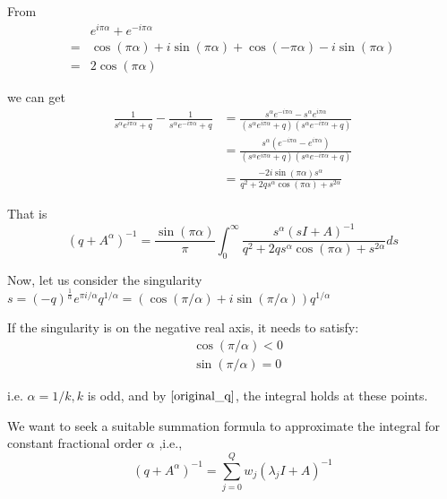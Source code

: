 From
\begin{equation}
	\begin{aligned}
	&e^{i \pi \alpha}+e^{- i \pi \alpha}\\
	=&\cos(\pi \alpha)+i\sin(\pi\alpha)+\cos(-\pi \alpha)-i \sin(\pi \alpha)\\
	=&2\cos(\pi \alpha)
\end{aligned}
\end{equation}

we can get
\begin{equation}
	\begin{aligned}
	\frac{1}{s^{\alpha}e^{i \pi \alpha}+q}-\frac{1}{s^{\alpha}e^{-i \pi \alpha}+q}&=\frac{s^{\alpha}e^{-i \pi \alpha}-s^{\alpha}e^{i \pi \alpha}}{(s^{\alpha}e^{i \pi \alpha}+q)(s^{\alpha}e^{-i \pi \alpha}+q)}\\
	&=\frac{s^{\alpha}(e^{-i \pi \alpha}-e^{i \pi \alpha})}{(s^{\alpha}e^{i \pi \alpha}+q)(s^{\alpha}e^{-i \pi \alpha}+q)}\\
	&=\frac{-2 i \sin(\pi \alpha)s^{\alpha}}{q^2+2qs^{\alpha}\cos(\pi\alpha)+s^{2\alpha}}
\end{aligned}
\end{equation}

That is
\begin{equation}
	(q+{A}^{\alpha})^{-1}=\frac{\sin(\pi \alpha)}{\pi}\int_0^{\infty}\frac{s^{\alpha}(s{I}+{A})^{-1}}{q^2+2qs^{\alpha}\cos(\pi\alpha)+s^{2\alpha}}ds
	\label{original_q}
\end{equation}

Now, let us consider the singularity $s=(-q)^{\frac{1}{\alpha}}e^{\pi i/{\alpha}}q^{1/{\alpha}}=(\cos(\pi/{\alpha})+i \sin(\pi/{\alpha}))q^ {1/\alpha}$

If the singularity is on the negative real axis, it needs to satisfy:
\begin{equation}
\begin{aligned}
&\cos(\pi/\alpha)<0\\
&\sin(\pi/{\alpha})=0
\end{aligned}
\end{equation}

i.e. $\alpha=1/k,k$ is odd, and by $\eqref{original_q}$, the integral holds at these points.

We want to seek a suitable summation formula to approximate the integral for constant fractional order $\alpha$ ,i.e.,
\begin{equation}
	(q+{A}^{\alpha})^{-1}=\sum_{j=0}^{Q}w_j(\lambda_jI+A)^{-1}
\end{equation}

